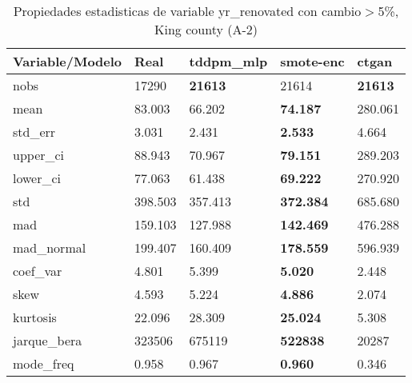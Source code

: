 \begin{table}[H]
\centering
\fontsize{8}{14}\selectfont
\caption{Propiedades estadisticas de variable yr\_renovated con cambio\ensuremath{>}5\%, King county (A-2)}
\label{table-stats-king county-a-2-yr_renovated-short}
\begin{tabular}{|l|m{10em}|m{10em}|m{10em}|m{10em}|}
\hline
 \rowcolor[gray]{0.8}
Variable/Modelo & Real & tddpm\_mlp & smote-enc & ctgan \\
\hline nobs & 17290 & \bfseries 21613 & \cellcolor[rgb]{0.9, 0.54, 0.52} 21614 & \bfseries 21613 \\
\hline mean & 83.003 & 66.202 & \bfseries 74.187 & \cellcolor[rgb]{0.9, 0.54, 0.52} 280.061 \\
\hline std\_err & 3.031 & 2.431 & \bfseries 2.533 & \cellcolor[rgb]{0.9, 0.54, 0.52} 4.664 \\
\hline upper\_ci & 88.943 & 70.967 & \bfseries 79.151 & \cellcolor[rgb]{0.9, 0.54, 0.52} 289.203 \\
\hline lower\_ci & 77.063 & 61.438 & \bfseries 69.222 & \cellcolor[rgb]{0.9, 0.54, 0.52} 270.920 \\
\hline std & 398.503 & 357.413 & \bfseries 372.384 & \cellcolor[rgb]{0.9, 0.54, 0.52} 685.680 \\
\hline mad & 159.103 & 127.988 & \bfseries 142.469 & \cellcolor[rgb]{0.9, 0.54, 0.52} 476.288 \\
\hline mad\_normal & 199.407 & 160.409 & \bfseries 178.559 & \cellcolor[rgb]{0.9, 0.54, 0.52} 596.939 \\
\hline coef\_var & 4.801 & 5.399 & \bfseries 5.020 & \cellcolor[rgb]{0.9, 0.54, 0.52} 2.448 \\
\hline skew & 4.593 & 5.224 & \bfseries 4.886 & \cellcolor[rgb]{0.9, 0.54, 0.52} 2.074 \\
\hline kurtosis & 22.096 & 28.309 & \bfseries 25.024 & \cellcolor[rgb]{0.9, 0.54, 0.52} 5.308 \\
\hline jarque\_bera & 323506 & \cellcolor[rgb]{0.9, 0.54, 0.52} 675119 & \bfseries 522838 & 20287 \\
\hline mode\_freq & 0.958 & 0.967 & \bfseries 0.960 & \cellcolor[rgb]{0.9, 0.54, 0.52} 0.346 \\
\hline
\end{tabular}
\end{table}
